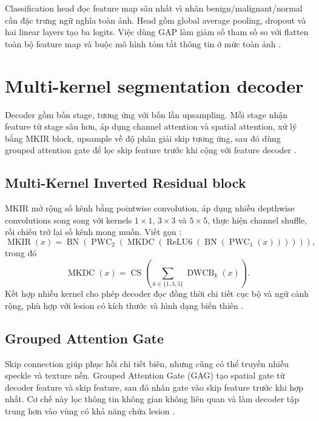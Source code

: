 \documentclass[12pt,a4paper,oneside]{report}
\begin{document}
Classification head đọc feature map sâu nhất vì nhãn benign/malignant/normal cần đặc trưng ngữ nghĩa toàn ảnh. Head gồm global average pooling, dropout và hai linear layers tạo ba logits. Việc dùng GAP làm giảm số tham số so với flatten toàn bộ feature map và buộc mô hình tóm tắt thông tin ở mức toàn ảnh \citep{mednet,damknet}.

\section{Multi-kernel segmentation decoder}

Decoder gồm bốn stage, tương ứng với bốn lần upsampling. Mỗi stage nhận feature từ stage sâu hơn, áp dụng channel attention và spatial attention, xử lý bằng MKIR block, upsample về độ phân giải skip tương ứng, sau đó dùng grouped attention gate để lọc skip feature trước khi cộng với feature decoder \citep{mkunet,damknet}.

\subsection{Multi-Kernel Inverted Residual block}

MKIR mở rộng số kênh bằng pointwise convolution, áp dụng nhiều depthwise convolutions song song với kernels $1\times1$, $3\times3$ và $5\times5$, thực hiện channel shuffle, rồi chiếu trở lại số kênh mong muốn. Viết gọn \citep{mobilenetv2,shufflenet,mkunet}:
\[
\operatorname{MKIR}(x)=\operatorname{BN}\left(\operatorname{PWC}_2\left(\operatorname{MKDC}\left(\operatorname{ReLU6}\left(\operatorname{BN}(\operatorname{PWC}_1(x))\right)\right)\right)\right),
\]
trong đó
\[
\operatorname{MKDC}(x)=\operatorname{CS}\left(\sum_{k\in\{1,3,5\}} \operatorname{DWCB}_{k}(x)\right).
\]
Kết hợp nhiều kernel cho phép decoder đọc đồng thời chi tiết cục bộ và ngữ cảnh rộng, phù hợp với lesion có kích thước và hình dạng biến thiên \citep{mkunet,damknet}.

\subsection{Grouped Attention Gate}

Skip connection giúp phục hồi chi tiết biên, nhưng cũng có thể truyền nhiễu speckle và texture nền. Grouped Attention Gate (GAG) tạo spatial gate từ decoder feature và skip feature, sau đó nhân gate vào skip feature trước khi hợp nhất. Cơ chế này lọc thông tin không gian không liên quan và làm decoder tập trung hơn vào vùng có khả năng chứa lesion \citep{unet,mkunet,damknet}.
\end{document}
